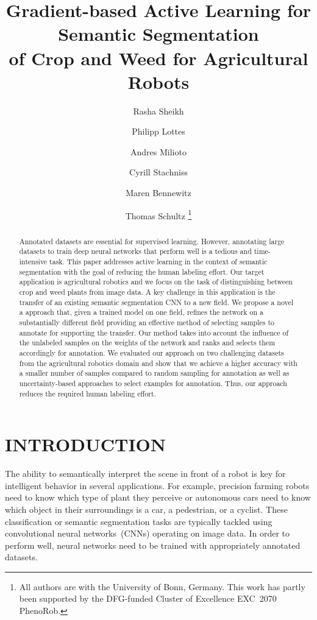\documentclass[letterpaper, 10 pt, conference]{ieeeconf}  %
\title{\LARGE \bf Gradient-based Active Learning for Semantic Segmentation \\of Crop and Weed for Agricultural Robots}
\author{Rasha Sheikh \and Philipp Lottes \and Andres Milioto \and Cyrill Stachniss \and Maren Bennewitz \and Thomas Schultz%
  \thanks{All authors are with the University of
    Bonn, Germany. This work has partly been supported by the DFG-funded Cluster of Excellence EXC~2070 PhenoRob.}%
}
\begin{document}
\maketitle
\thispagestyle{empty} 
\pagestyle{empty}


\begin{abstract}
Annotated datasets are essential for supervised learning. However, annotating
large datasets to  train deep neural networks that perform well is a tedious
and time-intensive task. This paper  addresses active learning in the context
of semantic segmentation with the goal of reducing the  human labeling effort.
Our target application is agricultural robotics and we focus on the task of
distinguishing between crop and weed plants from image data. A key challenge in this
application is the  transfer of an existing semantic segmentation CNN to a new
field. We propose a novel a approach that, given a trained model on one field,
refines the network on a substantially different field  providing an effective
method of selecting samples to annotate for supporting the transfer. Our
method takes into account the influence of the unlabeled samples on the
weights of the network and  ranks and selects them accordingly for annotation.
We evaluated our approach on two challenging  datasets from the agricultural
robotics domain and show that we achieve a higher accuracy with a  smaller
number of samples compared to random sampling for annotation as well as
uncertainty-based  approaches to select examples for annotation. Thus, our
approach reduces the required human labeling  effort.

\end{abstract} 

\section{INTRODUCTION}
\label{sec:intro}

The ability to semantically interpret the scene in front of a robot is key for
intelligent behavior in several applications. For example, precision farming
robots need to know which type of plant they perceive or autonomous cars need to
know  which object in their surroundings is a car, a pedestrian, or a
cyclist. These  classification or semantic segmentation tasks are typically
tackled using  convolutional neural networks~(CNNs) operating on  image data.
In order to perform  well, neural networks need to be trained with
appropriately annotated datasets.
\end{document}
